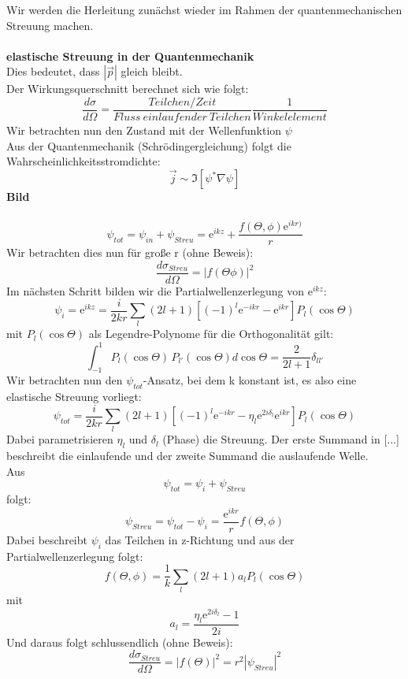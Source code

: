 Wir werden die Herleitung zunächst wieder im Rahmen der quantenmechanischen 
Streuung machen. \\
\\
\textbf{elastische Streuung in der Quantenmechanik} \\
Dies bedeutet, dass $\left| \vec{p} \right| $ gleich bleibt. \\
Der Wirkungsquerschnitt berechnet sich wie folgt: 
\[ \frac{d\sigma}{d\Omega} = \frac{\mathit{Teilchen/Zeit}}{\mathit{Fluss\ 
einlaufender\ Teilchen}} \frac{1}{\mathit{Winkelelement}} \]
Wir betrachten nun den Zustand mit der Wellenfunktion $\psi$ \\
Aus der Quantenmechanik (Schrödingergleichung) folgt die 
Wahrscheinlichkeitsstromdichte:
\[ \vec{j} \sim \Im{\left[ \psi^* \nabla \psi \right] } \]
\textbf{Bild} \\
\\
\[ \psi_{tot} = \psi_{in} + \psi_{Streu} = \mathrm{e}^{ikz} + \frac{f(\Theta, 
\phi) \mathrm{e}^{ikr)}}{r} \]
Wir betrachten dies nun für große r (ohne Beweis): \\
\[ \frac{d\sigma_{Streu}}{d\Omega} = {\left| f(\Theta \phi) \right|}^2 \]
Im nächsten Schritt bilden wir die Partialwellenzerlegung von 
$\mathrm{e}^{ikz}$:
\[ \psi_i = \mathrm{e}^{ikz} = \frac{i}{2kr} \sum_l (2l + 1) \left[ (-1)^l 
\mathrm{e}^{-ikr} - \mathrm{e}^{ikr} \right] P_l (\cos{\Theta}) \]
mit $P_l (\cos{\Theta}) $ als Legendre-Polynome für die Orthogonalität gilt: 
\[ \int_{-1}^{1} P_l (\cos{\Theta})\, P_{l'} (\cos{\Theta}) d\cos{\Theta} = 
\frac{2}{2l +1} \delta_{l l'} \] 
Wir betrachten nun den $\psi_{tot}$-Ansatz, bei dem k konstant ist, es also 
eine elastische Streuung vorliegt: 
\[ \psi_{tot} = \frac{i}{2kr} \sum_l (2l +1) \left[ {(-1)}^l \mathrm{e}^{-ikr} 
- \eta_l \mathrm{e}^{2i\delta_l} \mathrm{e}^{ikr} \right] P_l (\cos{\Theta}) \]
Dabei parametrisieren $\eta_l$ und $\delta_l$ (Phase) die Streuung. Der erste 
Summand in [...] beschreibt die einlaufende und der zweite Summand die 
auslaufende Welle. \\
Aus 
\[ \psi_{tot} = \psi_i + \psi_{Streu} \]
folgt: 
\[ \psi_{Streu} = \psi_{tot} - \psi_i = \frac{\mathrm{e}^{ikr}}{r} f(\Theta, 
\phi) \]
Dabei beschreibt $\psi_i$ das Teilchen in z-Richtung und aus der 
Partialwellenzerlegung folgt: 
\[ f(\Theta, \phi) = \frac{1}{k} \sum_l (2l + 1) a_l P_l (\cos{\Theta}) \]
mit
\[ a_l = \frac{\eta_l \mathrm{e}^{2i\delta_l} -1 }{2i} \]
Und daraus folgt schlussendlich (ohne Beweis):
\[ \frac{d\sigma_{Streu}}{d\Omega} = {\left| f(\Theta) \right|}^2 = r^2 {\left| 
\psi_{Streu} \right|}^2 \]
